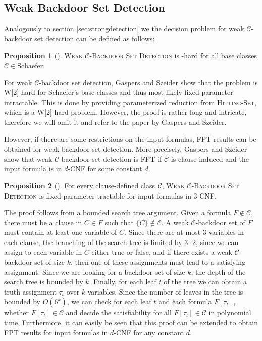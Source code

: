 \documentclass[11pt,a4paper]{article}
\makeatletter
\newcommand{\problemtitle}[1]{\gdef\@problemtitle{#1}}%
\newcommand{\probleminput}[1]{\gdef\@probleminput{#1}}%
\newcommand{\problemquestion}[1]{\gdef\@problemquestion{#1}}%
\newcommand{\problemparam}[1]{\gdef\@problemparam{#1}}%
\theoremstyle{definition}
\theoremstyle{proposition}
\newtheorem{proposition}{Proposition}[section]
\makeatother
\begin{document}
\subsection{Weak Backdoor Set Detection}

Analogously to section \ref{sec:strongdetection} we the decision problem for weak $\mathcal{C}$-backdoor set detection can be defined as follows:
\begin{csproblemparam}
    \problemtitle{Weak $\mathcal{C}$-Backdoor Set Detection}
    \probleminput{A CNF formula $F$ and an integer $k \geq 0$}
    \problemparam{The integer $k$}
    \problemquestion{Does $F$ have a weak $\mathcal{C}$-backdoor set of size at most $k$?}
\end{csproblemparam}
\begin{proposition}[{\cite[Proposition 1, p.293f]{Gaspers2012}}]
\textsc{Weak $\mathcal{C}$-Backdoor Set Detection} is -hard for all base classes $\mathcal{C}\in \text{Schaefer}$.
\end{proposition} 
For weak $\mathcal{C}$-backdoor set detection, Gaspers and Szeider show that the problem is W[2]-hard for Schaefer's base classes and thus most likely fixed-parameter intractable. This is done by providing parameterized reduction from \textsc{Hitting-Set}, which is a W[2]-hard problem. However, the proof is rather long and intricate, therefore we will omit it and refer to the paper by Gaspers and Szeider.

However, if there are some restrictions on the input formulas, FPT results can be obtained for weak backdoor set detection. More precisely, Gaspers and Szeider show that weak $\mathcal{C}$-backdoor set detection is FPT if $\mathcal{C}$ is clause induced and the input formula is in $d$-CNF for some constant $d$. 
\begin{proposition}[{\cite[Proposition 2, p.294f]{Gaspers2012}}]
For every clause-defined class $\mathcal{C}$, \textsc{Weak $\mathcal{C}$-Backdoor Set Detection} is fixed-parameter tractable for input formulas in 3-CNF.
\end{proposition}
The proof follows from a bounded search tree argument. Given a formula $F \notin \mathcal{C}$, there must be a clause in $C \in F$ such that $\{C\} \notin \mathcal{C}$. A weak $\mathcal{C}$-backdoor set of $F$ must contain at least one variable of $C$. Since there are at most 3 variables in each clause, the branching of the search tree is limited by $3 \cdot 2$, since we can assign to each variable in $C$ either true or false, and if there exists a weak $\mathcal{C}$-backdoor set of size $k$, then one of these assignments must lead to a satisfying assignment. Since we are looking for a backdoor set of size $k$, the depth of the search tree is bounded by $k$. Finally, for each leaf $t$ of the tree we can obtain a truth assignment $\tau_t$ over $k$ variables. Since the number of leaves in the tree is bounded by $O(6^k)$, we can check for each leaf $t$ and each formula $F[\tau_t]$, whether $F[\tau_t] \in \mathcal{C}$ and decide the satisfiability for all $F[\tau_t] \in \mathcal{C}$ in polynomial time. Furthermore, it can easily be seen that this proof can be extended to obtain FPT results for input formulas in $d$-CNF for any constant $d$.  
\end{document}
